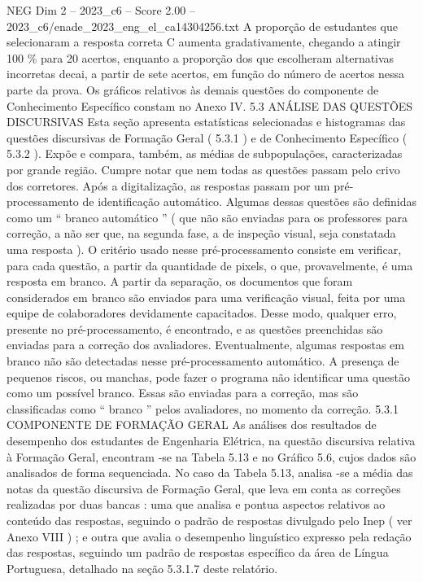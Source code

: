\begin{textsample}{NEG Dim 2 – 2023\_c6 – Score 2.00 – 2023\_c6/enade\_2023\_eng\_el\_ca14304256.txt}
A proporção de estudantes que selecionaram a resposta correta C aumenta gradativamente, chegando a atingir 100 \% para 20 acertos, enquanto a proporção dos que escolheram alternativas incorretas decai, a partir de sete acertos, em função do número de acertos nessa parte da prova.
Os gráficos relativos às demais questões do componente de Conhecimento Específico constam no Anexo IV. 5.3 ANÁLISE DAS QUESTÕES DISCURSIVAS Esta seção apresenta estatísticas selecionadas e histogramas das questões discursivas de Formação Geral ( 5.3.1 ) e de Conhecimento Específico ( 5.3.2 ).
Expõe e compara, também, as médias de subpopulações, caracterizadas por grande região.
Cumpre notar que nem todas as questões passam pelo crivo dos corretores.
Após a digitalização, as respostas passam por um pré-processamento de identificação automático.
Algumas dessas questões são definidas como um “ branco automático ” ( que não são enviadas para os professores para correção, a não ser que, na segunda fase, a de inspeção visual, seja constatada uma resposta ).
O critério usado nesse pré-processamento consiste em verificar, para cada questão, a partir da quantidade de pixels, o que, provavelmente, é uma resposta em branco.
A partir da separação, os documentos que foram considerados em branco são enviados para uma verificação visual, feita por uma equipe de colaboradores devidamente capacitados.
Desse modo, qualquer erro, presente no pré-processamento, é encontrado, e as questões preenchidas são enviadas para a correção dos avaliadores.
Eventualmente, algumas respostas em branco não são detectadas nesse pré-processamento automático.
A presença de pequenos riscos, ou manchas, pode fazer o programa não identificar uma questão como um possível branco.
Essas são enviadas para a correção, mas são classificadas como “ branco ” pelos avaliadores, no momento da correção. 5.3.1 COMPONENTE DE FORMAÇÃO GERAL As análises dos resultados de desempenho dos estudantes de Engenharia Elétrica, na questão discursiva relativa à Formação Geral, encontram -se na Tabela 5.13 e no Gráfico 5.6, cujos dados são analisados de forma sequenciada.
No caso da Tabela 5.13, analisa -se a média das notas da questão discursiva de Formação Geral, que leva em conta as correções realizadas por duas bancas : uma que analisa e pontua aspectos relativos ao conteúdo das respostas, seguindo o padrão de respostas divulgado pelo Inep ( ver Anexo VIII ) ; e outra que avalia o desempenho linguístico expresso pela redação das respostas, seguindo um padrão de respostas específico da área de Língua Portuguesa, detalhado na seção 5.3.1.7 deste relatório.

\end{textsample}
